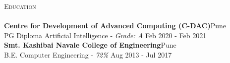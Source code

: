 \documentclass[a4paper]{article}
\newcommand{\lineunder} {
    \vspace*{-8pt} \\
    \hspace*{-18pt} \hrulefill \\
}
\newcommand{\header} [1] {
    {\hspace*{-18pt}\vspace*{6pt} \textsc{#1}}
    \vspace*{-6pt} \lineunder
}
\begin{document}
\header{Education}
\textbf{Centre for Development of Advanced Computing (C-DAC)}\hfill Pune\\
PG Diploma Artificial Intelligence - \textit{Grade: A} \hfill Feb 2020 - Feb 2021\\
\vspace{2mm}
\textbf{Smt. Kashibai Navale College of Engineering}\hfill Pune\\
B.E. Computer Engineering - \textit{72\%} \hfill Aug 2013 - Jul 2017\\
\vspace{2mm}



\end{document}
